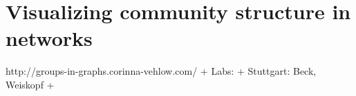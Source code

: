 \section{Visualizing community structure in
networks}\label{visualizing-community-structure-in-networks}

http://groups-in-graphs.corinna-vehlow.com/ + Labs: + Stuttgart: Beck,
Weiskopf +
